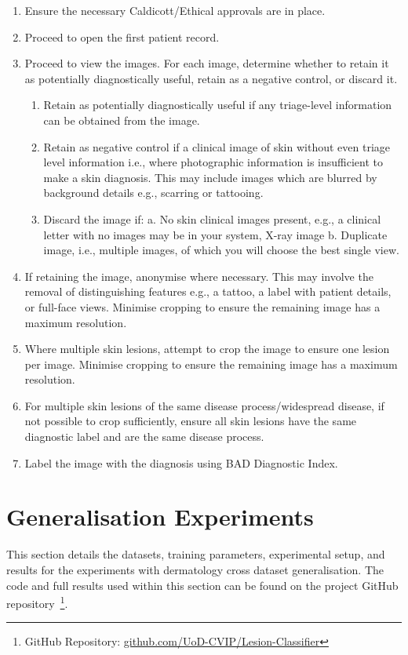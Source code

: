 \begin{enumerate}
	\item Ensure the necessary Caldicott/Ethical approvals are in place. 
	\item Proceed to open the first patient record.
	\item Proceed to view the images. For each image, determine whether to retain it as potentially diagnostically useful, retain as a negative control, or discard it.
	\begin{enumerate}
		\item Retain as potentially diagnostically useful if any triage-level information can be obtained from the image.
		\item Retain as negative control if a clinical image of skin without even triage level information i.e., where photographic information is insufficient to make a skin diagnosis. This may include images which are blurred by background details e.g., scarring or tattooing.
		\item Discard the image if: a. No skin clinical images present, e.g., a clinical letter with no images may be in your system, X-ray image b. Duplicate image, i.e., multiple images, of which you will choose the best single view.
	\end{enumerate}
	\item If retaining the image, anonymise where necessary. This may involve the removal of distinguishing features e.g., a tattoo, a label with patient details, or full-face views. Minimise cropping to ensure the remaining image has a maximum resolution. 
	\item Where multiple skin lesions, attempt to crop the image to ensure one lesion per image. Minimise cropping to ensure the remaining image has a maximum resolution.
	\item For multiple skin lesions of the same disease process/widespread disease, if not possible to crop sufficiently, ensure all skin lesions have the same diagnostic label and are the same disease process.
	\item Label the image with the diagnosis using BAD Diagnostic Index.
\end{enumerate}



\section{Generalisation Experiments}
\label{sec:generalisation_experiments}
This section details the datasets, training parameters, experimental setup, and results for the experiments with dermatology cross dataset generalisation. The code and full results used within this section can be found on the project GitHub repository~\footnote{GitHub Repository: \url{github.com/UoD-CVIP/Lesion-Classifier}}.

